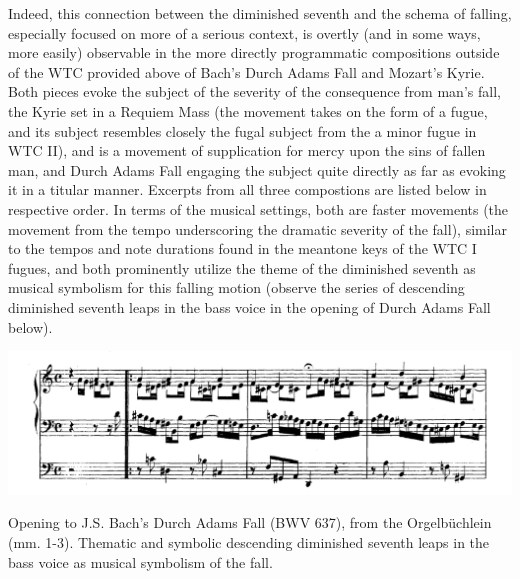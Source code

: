 Indeed, this connection between the diminished seventh and the schema of
falling, especially focused on more of a serious context, is overtly
(and in some ways, more easily) observable in the more directly
programmatic compositions outside of the WTC provided above of Bach's
Durch Adams Fall and Mozart's Kyrie. Both pieces evoke the subject of
the severity of the consequence from man's fall, the Kyrie set in a
Requiem Mass (the movement takes on the form of a fugue, and its subject
resembles closely the fugal subject from the a minor fugue in WTC II),
and is a movement of supplication for mercy upon the sins of fallen man,
and Durch Adams Fall engaging the subject quite directly as far as
evoking it in a titular manner. Excerpts from all three compostions are
listed below in respective order. In terms of the musical settings, both
are faster movements (the movement from the tempo underscoring the
dramatic severity of the fall), similar to the tempos and note durations
found in the meantone keys of the WTC I fugues, and both prominently
utilize the theme of the diminished seventh as musical symbolism for
this falling motion (observe the series of descending diminished seventh
leaps in the bass voice in the opening of Durch Adams Fall below).
\begin{Example}[H]
\centering
\includegraphics{durch_adams_fall_nt.png}
\caption[Opening to J.S. Bach's Durch Adams Fall (BWV 637), from the Orgelbüchlein.]{Opening to J.S. Bach's Durch Adams Fall (BWV 637), from the Orgelbüchlein (mm. 1-3). Thematic and symbolic descending diminished seventh leaps in the bass voice as musical symbolism of the fall.}
\end{Example}


